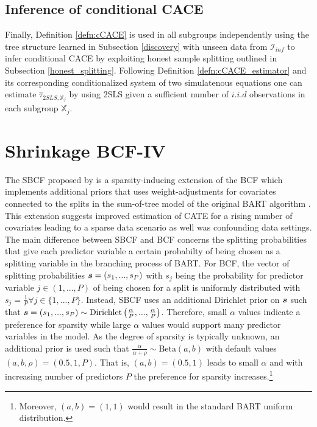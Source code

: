 \subsection{Inference of conditional CACE}
\label{inference}
Finally, Definition \ref{defn:cCACE} is used in all subgroups independently using the tree structure learned in Subsection \ref{discovery} with unseen data from $\mathcal{I}_{inf}$ to infer conditional CACE by exploiting honest sample splitting outlined in Subsection \ref{honest_splitting}.
Following Definition \ref{defn:cCACE_estimator} and its corresponding conditionalized system of two simulatenous equations one can estimate $\widehat{\tau}_{2SLS, \mathbb{X}_j}$ by using 2SLS given a sufficient number of $i.i.d$ observations in each subgroup $\mathbb{X}_j$.  





\section{Shrinkage BCF-IV}
\label{sec:SBCF-IV}

The SBCF proposed by \cite{caron_shrinkage_2022} is a sparsity-inducing extension of the BCF which implements additional priors that uses weight-adjustments for covariates connected to the splits in the sum-of-tree model of the original BART algorithm \citep{chipman_bart_2010}. This extension suggests improved estimation of CATE for a rising number of covariates leading to a sparse data scenario as well was confounding data settings. 
The main difference between SBCF and BCF concerns the splitting probabilities that give each predictor variable a certain probabilty of being chosen as a splitting variable in the branching process of BART. 
For BCF, the vector of splitting probabilities $\bm s=\left(s_1, ..., s_P\right)$ with $s_j$ being the probability for predictor variable $j \in \left(1, ..., P \right)$ of being chosen for a split is uniformly distributed with $s_j=\frac{1}{P} \forall j \in \{1, ..., P \}$. Instead, SBCF uses an additional Dirichlet prior on $\bm s$ such that $\bm s =\left(s_1, ..., s_P \right) \sim \text{Dirichlet}\left( \frac{\alpha}{P}, ..., \frac{\alpha}{P} \right)$. Therefore, small $\alpha$ values indicate a preference for sparsity while large $\alpha$ values would support many predictor variables in the model. As the degree of sparsity is typically unknown, an additional prior is used such that $\frac{\alpha}{\alpha+\rho} \sim {\text{Beta}\left(a, b\right)}$ with default values $\left(a, b, \rho \right) = \left(0.5, 1,P \right)$. That is, $(a, b) = (0.5, 1)$ leads to small $\alpha$ and with increasing number of predictors $P$ the preference for sparsity increases.\footnote{Moreover, $(a, b) = (1, 1)$ would result in the standard BART uniform distribution.}

